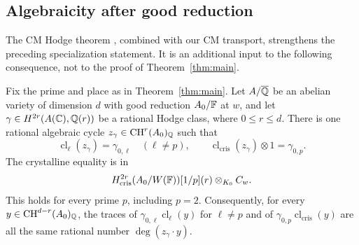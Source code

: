 \subsection{Algebraicity after good reduction}

The CM Hodge theorem \cite[Theorem~1.1]{OpenAICMHodge2026}, combined
with our CM transport, strengthens the preceding specialization
statement. It is an additional input to the following consequence,
not to the proof of Theorem~\ref{thm:main}.

\begin{corollary}
\label{cor:algebraic-specialization}
Fix the prime and place as in Theorem~\ref{thm:main}. Let
\(A/\overline{\mathbb Q}\) be an abelian variety of dimension \(d\) with good
reduction \(A_0/\mathbb F\) at \(w\), and let
\(\gamma\in H^{2r}(A(\mathbb C),\mathbb Q(r))\) be a rational Hodge class,
where \(0\leq r\leq d\). There is one rational algebraic cycle
\(z_\gamma\in\operatorname{CH}^r(A_0)_{\mathbb Q}\) such that
\[
 \operatorname{cl}_\ell(z_\gamma)=\gamma_{0,\ell}
       \quad(\ell\ne p),\qquad
 \operatorname{cl}_{\mathrm{cris}}(z_\gamma)\otimes1=\gamma_{0,p}.
\]
The crystalline equality is in
\[
 H^{2r}_{\mathrm{cris}}(A_0/W(\mathbb F))[1/p](r)
       \otimes_{K_0}C_w.
\]
This holds for every prime \(p\), including \(p=2\).
Consequently, for every
\(y\in\operatorname{CH}^{d-r}(A_0)_{\mathbb Q}\), the traces of
\(\gamma_{0,\ell}\operatorname{cl}_\ell(y)\) for \(\ell\ne p\)
and of \(\gamma_{0,p}\operatorname{cl}_{\mathrm{cris}}(y)\)
are all the same rational number \(\deg(z_\gamma\cdot y)\).
\end{corollary}

